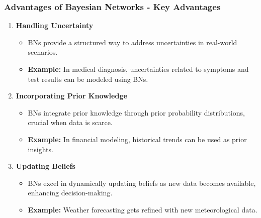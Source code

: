 \documentclass[aspectratio=169]{beamer}
\begin{document}
\begin{frame}[fragile]
    \frametitle{Advantages of Bayesian Networks - Key Advantages}
    \begin{enumerate}
        \item \textbf{Handling Uncertainty}
            \begin{itemize}
                \item BNs provide a structured way to address uncertainties in real-world scenarios.
                \item \textbf{Example:} In medical diagnosis, uncertainties related to symptoms and test results can be modeled using BNs.
            \end{itemize}
        
        \item \textbf{Incorporating Prior Knowledge}
            \begin{itemize}
                \item BNs integrate prior knowledge through prior probability distributions, crucial when data is scarce.
                \item \textbf{Example:} In financial modeling, historical trends can be used as prior insights.
            \end{itemize}
        
        \item \textbf{Updating Beliefs}
            \begin{itemize}
                \item BNs excel in dynamically updating beliefs as new data becomes available, enhancing decision-making.
                \item \textbf{Example:} Weather forecasting gets refined with new meteorological data.
            \end{itemize}
    \end{enumerate}
\end{frame}
\end{document}
